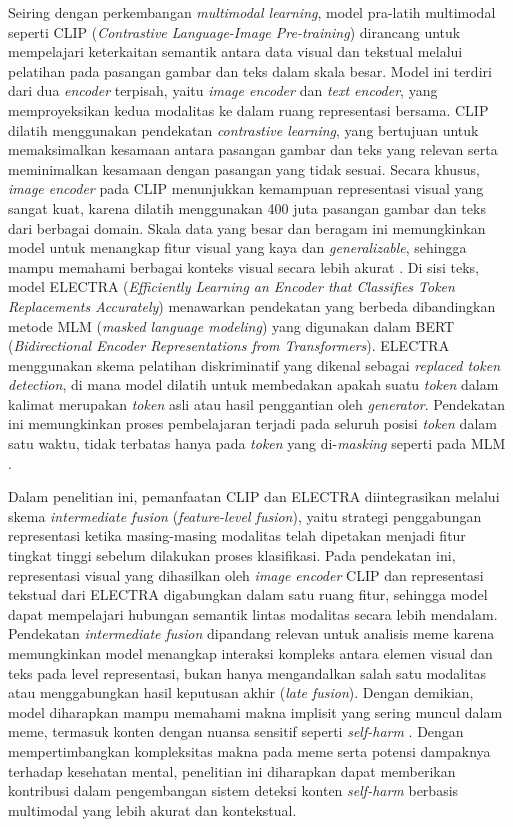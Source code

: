 Seiring dengan perkembangan \textit{multimodal learning}, model pra-latih multimodal seperti CLIP (\textit{Contrastive Language-Image Pre-training}) dirancang untuk mempelajari keterkaitan semantik antara data visual dan tekstual melalui pelatihan pada pasangan gambar dan teks dalam skala besar. Model ini terdiri dari dua \textit{encoder} terpisah, yaitu \textit{image encoder} dan \textit{text encoder}, yang memproyeksikan kedua modalitas ke dalam ruang representasi bersama. CLIP dilatih menggunakan pendekatan \textit{contrastive learning}, yang bertujuan untuk memaksimalkan kesamaan antara pasangan gambar dan teks yang relevan serta meminimalkan kesamaan dengan pasangan yang tidak sesuai. Secara khusus, \textit{image encoder} pada CLIP menunjukkan kemampuan representasi visual yang sangat kuat, karena dilatih menggunakan 400 juta pasangan gambar dan teks dari berbagai domain. Skala data yang besar dan beragam ini memungkinkan model untuk menangkap fitur visual yang kaya dan \textit{generalizable}, sehingga mampu memahami berbagai konteks visual secara lebih akurat \cite{radford2021clip}. Di sisi teks, model ELECTRA (\textit{Efficiently Learning an Encoder that Classifies Token Replacements Accurately}) menawarkan pendekatan yang berbeda dibandingkan metode MLM (\textit{masked language modeling}) yang digunakan dalam BERT (\textit{Bidirectional Encoder Representations from Transformers}). ELECTRA menggunakan skema pelatihan diskriminatif yang dikenal sebagai \textit{replaced token detection}, di mana model dilatih untuk membedakan apakah suatu \textit{token} dalam kalimat merupakan \textit{token} asli atau hasil penggantian oleh \textit{generator}. Pendekatan ini memungkinkan proses pembelajaran terjadi pada seluruh posisi \textit{token} dalam satu waktu, tidak terbatas hanya pada \textit{token} yang di-\textit{masking} seperti pada MLM \cite{clark2020electra}. 

Dalam penelitian ini, pemanfaatan CLIP dan ELECTRA  diintegrasikan melalui skema \textit{intermediate fusion} (\textit{feature-level fusion}), yaitu strategi penggabungan representasi ketika masing-masing modalitas telah dipetakan menjadi fitur tingkat tinggi sebelum dilakukan proses klasifikasi. Pada pendekatan ini, representasi visual yang dihasilkan oleh \textit{image encoder} CLIP dan representasi tekstual dari ELECTRA digabungkan dalam satu ruang fitur, sehingga model dapat mempelajari hubungan semantik lintas modalitas secara lebih mendalam. Pendekatan \textit{intermediate fusion} dipandang relevan untuk analisis meme karena memungkinkan model menangkap interaksi kompleks antara elemen visual dan teks pada level representasi, bukan hanya mengandalkan salah satu modalitas atau menggabungkan hasil keputusan akhir (\textit{late fusion}). Dengan demikian, model diharapkan mampu memahami makna implisit yang sering muncul dalam meme, termasuk konten dengan nuansa sensitif seperti \textit{self-harm} \cite{boulahia2021fusion}. Dengan mempertimbangkan kompleksitas makna pada meme serta potensi dampaknya terhadap kesehatan mental, penelitian ini diharapkan dapat memberikan kontribusi dalam pengembangan sistem deteksi konten \textit{self-harm} berbasis multimodal yang lebih akurat dan kontekstual.

